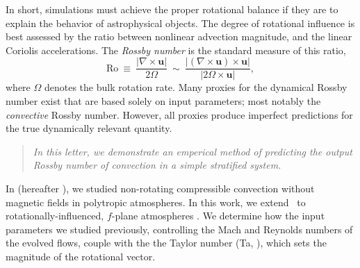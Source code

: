 \documentclass[twocolumn, amsmath, amsfonts, amssymb]{aastex62}
\begin{document}

In short, simulations must achieve the proper rotational balance if they are to explain 
the behavior of astrophysical objects. 
The degree of rotational influence is best assessed by the ratio between 
nonlinear advection magnitude, and the linear Coriolis accelerations. 
The \textit{Rossby number} is the standard measure of this ratio, 
\begin{equation}
\text{Ro} \ \equiv \ \frac{| \nabla \times \boldsymbol{u} | }{2 \Omega} \ 
\sim \ \frac{| (\nabla \times \boldsymbol{u}) \times \boldsymbol{u}  | }{|2 \Omega \times \boldsymbol{u}|},
\label{eqn:rossby-def}
\end{equation}
where $\Omega$ denotes the bulk rotation rate. 
Many proxies for the dynamical Rossby number exist that are based solely on input parameters; most notably the \textit{convective} Rossby number. 
However, all proxies produce imperfect predictions for the true dynamically relevant quantity.
\begin{quote}
\emph{In this letter, we demonstrate an emperical method of predicting the output Rossby number
of convection in a simple stratified system.}
\end{quote}
In \cite{anders&brown2017} (hereafter \AB), we studied non-rotating compressible convection without magnetic fields in polytropic atmospheres. 
In this work, we extend \AB$\,$ to rotationally-influenced, $f$-plane
atmospheres 
\cite[e.g.][]{brummell&all1996, brummell&all1998, calkins&all2015a}. 
We determine how the input parameters we studied previously, controlling the Mach and
Reynolds numbers of the evolved flows, couple with the the Taylor number (Ta, \cite{julien&all1996}), which sets the magnitude of the rotational vector. 
\end{document}
